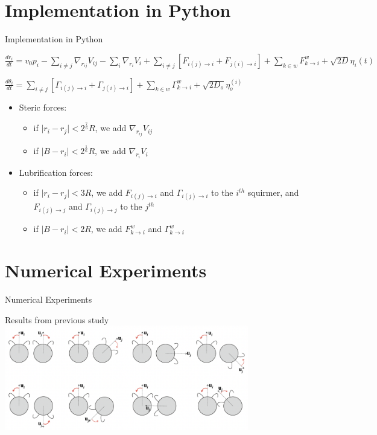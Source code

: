 \documentclass{beamer}
\begin{document}
\section{Implementation in Python}
\begin{frame}{Implementation in Python}
\begin{center}
    \footnotesize
        \(\boxed{\frac{dr_i}{dt} = v_0 p_i -  \sum\limits_{i \ne j}\nabla_{r_{ij}} V_{ij} - \sum\limits_{i}\nabla_{r_i} V_i + \sum\limits_{i\ne j}\left[F_{i(j)\rightarrow i} + F_{j(i)\rightarrow i}\right]+ \sum\limits_{k \in w}F_{k\rightarrow i}^w + \sqrt{2D}\eta_i(t)}\)
\end{center}
\begin{center}
    \footnotesize
        \(\boxed{\frac{d \theta_i}{dt} = \sum\limits_{i\ne j} \left[\Gamma_{i(j)\rightarrow i} + \Gamma_{j(i)\rightarrow i}\right] + \sum\limits_{k\in w} \Gamma_{k\rightarrow i}^w + \sqrt{2D_o} \eta_o^{(i)}}\)
\end{center}
\normalsize
\begin{itemize}
    \item Steric forces:
    \begin{itemize}
        \item if $\lvert r_i-r_j\rvert < 2^{\frac{7}{6}}R$, we add $\nabla_{r_{ij}}V_{ij}$
        \item if $\lvert B-r_i\rvert < 2^{\frac{1}{6}}R$, we add $\nabla_{r_{i}}V_{i}$
    \end{itemize}
    \item Lubrification forces:
    \begin{itemize}
        \item if $\lvert r_i-r_j\rvert < 3R$, we add $F_{i(j)\rightarrow i}$ and $\Gamma_{i(j)\rightarrow i}$ to the $i^{th}$ squirmer, and $F_{i(j)\rightarrow j}$ and $\Gamma_{i(j)\rightarrow j}$ to the $j^{th}$
        \item if $\lvert B-r_i\rvert < 2R$, we add $F_{k\rightarrow i}^w$ and $\Gamma_{k\rightarrow i}^w$
    \end{itemize}
\end{itemize}
\end{frame}

\section{Numerical Experiments}
\begin{frame}{Numerical Experiments}
    \begin{center}
        Results from previous study \cite{Stark}
        \includegraphics[width=0.8\textwidth]{../images/stark_behavior.png}
        \cite{Stark}
    \end{center}
\end{frame}
\end{document}
